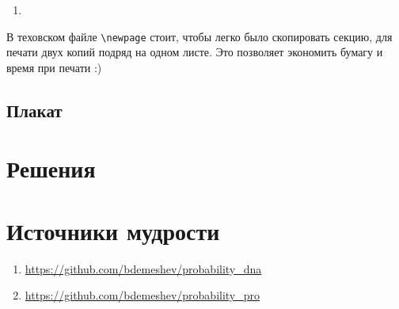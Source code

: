 \documentclass[12pt]{article}
\newcounter{problem}[section]
\theoremstyle{definition}
\begin{document}
\begin{enumerate}
  \item 
\end{enumerate}

В теховском файле \verb|\newpage| стоит, чтобы легко было скопировать секцию, для печати двух копий подряд на одном листе.
Это позволяет экономить бумагу и время при печати :)

\subsection{Плакат}






\renewenvironment{solution}[1]{%
         \vskip .5cm plus 2cm minus 0.1cm%
         {\bfseries \hyperlink{problem:#1}{#1.}}%
}%
{%
}%



\section{Решения}



\section{Источники мудрости}


\begin{enumerate}
\item \url{https://github.com/bdemeshev/probability_dna}
\item \url{https://github.com/bdemeshev/probability_pro}
\end{enumerate}

\printbibliography[heading=none]
\end{document}
